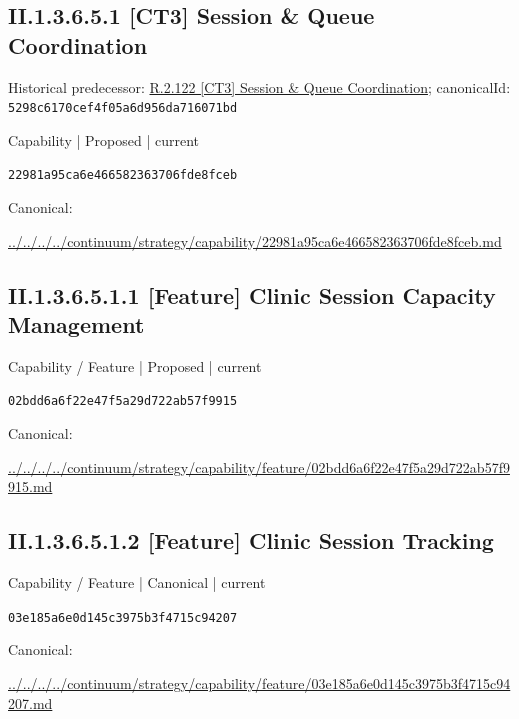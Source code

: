 \documentclass[10pt,a4paper]{article}
\begin{document}
\subsection*{II.1.3.6.5.1 [CT3] Session \& Queue Coordination}
Historical predecessor: \hyperref[element-5298c6170cef4f05a6d956da716071bd]{R.2.122 [CT3] Session \& Queue Coordination}; canonicalId: \texttt{5298c6170cef4f05a6d956da716071bd}\par
\label{element-22981a95ca6e466582363706fde8fceb}
{\small Capability | Proposed | current}\par
\texttt{22981a95ca6e466582363706fde8fceb}\par
Canonical: \par
{\footnotesize\url{../../../../continuum/strategy/capability/22981a95ca6e466582363706fde8fceb.md}}\par
\subsection*{II.1.3.6.5.1.1 [Feature] Clinic Session Capacity Management}
\label{element-02bdd6a6f22e47f5a29d722ab57f9915}
{\small Capability / Feature | Proposed | current}\par
\texttt{02bdd6a6f22e47f5a29d722ab57f9915}\par
Canonical: \par
{\footnotesize\url{../../../../continuum/strategy/capability/feature/02bdd6a6f22e47f5a29d722ab57f9915.md}}\par
\subsection*{II.1.3.6.5.1.2 [Feature] Clinic Session Tracking}
\label{element-03e185a6e0d145c3975b3f4715c94207}
{\small Capability / Feature | Canonical | current}\par
\texttt{03e185a6e0d145c3975b3f4715c94207}\par
Canonical: \par
{\footnotesize\url{../../../../continuum/strategy/capability/feature/03e185a6e0d145c3975b3f4715c94207.md}}\par
\end{document}
